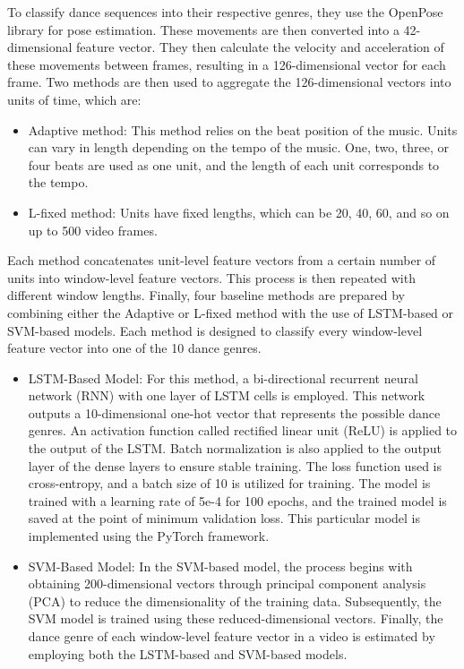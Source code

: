 \documentclass[12pt]{article}
\begin{document}
To classify dance sequences into their respective genres, they use the OpenPose library for pose estimation. These movements are then converted into a 42-dimensional feature vector. They then calculate the velocity and acceleration of these movements between frames, resulting in a 126-dimensional vector for each frame. Two methods are then used to aggregate the 126-dimensional vectors into units of time, which are:
\begin{itemize}
    \item Adaptive method: This method relies on the beat position of the music. Units can vary in length depending on the tempo of the music. One, two, three, or four beats are used as one unit, and the length of each unit corresponds to the tempo.
    \item L-fixed method: Units have fixed lengths, which can be 20, 40, 60, and so on up to 500 video frames.
\end{itemize}
\par Each method concatenates unit-level feature vectors from a certain number of units into window-level feature vectors. This process is then repeated with different window lengths. Finally, four baseline methods are prepared by combining either the Adaptive or L-fixed method with the use of LSTM-based or SVM-based models. Each method is designed to classify every window-level feature vector into one of the 10 dance genres.     
\begin{itemize}

    \item LSTM-Based Model: For this method, a bi-directional recurrent neural network (RNN) with one layer of LSTM cells is employed. This network outputs a 10-dimensional one-hot vector that represents the possible dance genres. An activation function called rectified linear unit (ReLU) is applied to the output of the LSTM. Batch normalization is also applied to the output layer of the dense layers to ensure stable training. The loss function used is cross-entropy, and a batch size of 10 is utilized for training. The model is trained with a learning rate of 5e-4 for 100 epochs, and the trained model is saved at the point of minimum validation loss. This particular model is implemented using the PyTorch framework.

    \item SVM-Based Model: In the SVM-based model, the process begins with obtaining 200-dimensional vectors through principal component analysis (PCA) to reduce the dimensionality of the training data. Subsequently, the SVM model is trained using these reduced-dimensional vectors. Finally, the dance genre of each window-level feature vector in a video is estimated by employing both the LSTM-based and SVM-based models.
\end{itemize}
\end{document}
